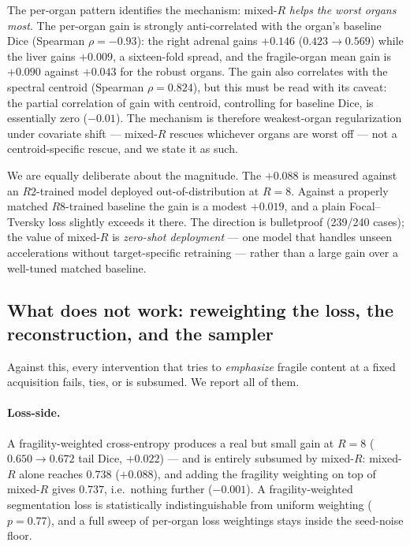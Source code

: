 \documentclass[10pt,twocolumn,letterpaper]{article}
\begin{document}
The per-organ pattern identifies the mechanism: mixed-$R$ \emph{helps the worst organs most}. The per-organ gain is strongly anti-correlated with the organ's baseline Dice (Spearman $\rho{=}-0.93$): the right adrenal gains $+0.146$ ($0.423\!\to\!0.569$) while the liver gains $+0.009$, a sixteen-fold spread, and the fragile-organ mean gain is $+0.090$ against $+0.043$ for the robust organs. The gain also correlates with the spectral centroid (Spearman $\rho=0.824$), but this must be read with its caveat: the partial correlation of gain with centroid, controlling for baseline Dice, is essentially zero ($-0.01$). The mechanism is therefore weakest-organ regularization under covariate shift --- mixed-$R$ rescues whichever organs are worst off --- not a centroid-specific rescue, and we state it as such.

We are equally deliberate about the magnitude. The $+0.088$ is measured against an $R2$-trained model deployed out-of-distribution at $R=8$. Against a properly matched $R8$-trained baseline the gain is a modest $+0.019$, and a plain Focal--Tversky loss slightly exceeds it there. The direction is bulletproof (239/240 cases); the value of mixed-$R$ is \emph{zero-shot deployment} --- one model that handles unseen accelerations without target-specific retraining --- rather than a large gain over a well-tuned matched baseline.

\subsection{What does not work: reweighting the loss, the reconstruction, and the sampler}
\label{sec:negatives}

Against this, every intervention that tries to \emph{emphasize} fragile content at a fixed acquisition fails, ties, or is subsumed. We report all of them.

\paragraph{Loss-side.} A fragility-weighted cross-entropy produces a real but small gain at $R=8$ ($0.650\!\to\!0.672$ tail Dice, $+0.022$) --- and is entirely subsumed by mixed-$R$: mixed-$R$ alone reaches $0.738$ ($+0.088$), and adding the fragility weighting on top of mixed-$R$ gives $0.737$, i.e.\ nothing further ($-0.001$). A fragility-weighted segmentation loss is statistically indistinguishable from uniform weighting ($p=0.77$), and a full sweep of per-organ loss weightings stays inside the seed-noise floor.
\end{document}
